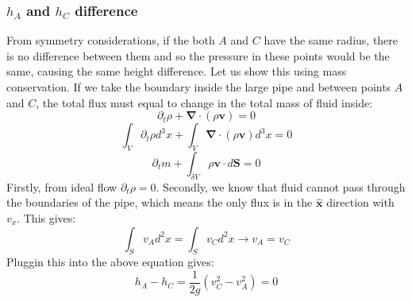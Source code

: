 \documentclass{article}
\begin{document}
\subsubsection{$h_A$ and $h_C$ difference}
From symmetry considerations, if the both $A$ and $C$ have the same radius, there is no difference between them and so the pressure in these points would be the same, causing the same height difference. Let us show this using mass conservation.
\newline
If we take the boundary inside the large pipe and between points $A$ and $C$, the total flux must equal to change in the total mass of fluid inside:
\begin{equation}
    \partial_t \rho + \boldsymbol{\nabla}\cdot (\rho \boldsymbol{v}) = 0
\end{equation}
\begin{equation}
    \int_V \partial_t \rho d^3x + \int_V \boldsymbol{\nabla}\cdot (\rho \boldsymbol{v}) d^3x = 0
\end{equation}
\begin{equation}
    \partial_t m + \int_{\delta V} \rho \boldsymbol{v} \cdot d\boldsymbol{S} = 0
\end{equation}
Firstly, from ideal flow $\partial_t \rho = 0$. Secondly, we know that fluid cannot pass through the boundaries of the pipe, which means the only flux is in the $\boldsymbol{\hat{x}}$ direction with $v_x$. This gives:
\begin{equation}
    \int_{S} v_A d^2x = \int_{S} v_C d^2x \rightarrow v_A = v_C
\end{equation}
Pluggin this into the above equation gives:
\begin{equation}
    \boxed{h_A - h_C = \frac{1}{2g}(v_C^2 - v_A^2) = 0}
\end{equation}
\end{document}
